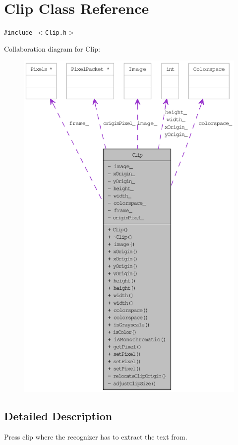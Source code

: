 \hypertarget{class_clip}{
\section{Clip Class Reference}
\label{class_clip}
}
{\tt \#include $<$Clip.h$>$}

Collaboration diagram for Clip:\nopagebreak
\begin{figure}[H]
\begin{center}
\leavevmode
\includegraphics[width=400pt]{class_clip__coll__graph}
\end{center}
\end{figure}


\subsection{Detailed Description}
Press clip where the recognizer has to extract the text from. 

